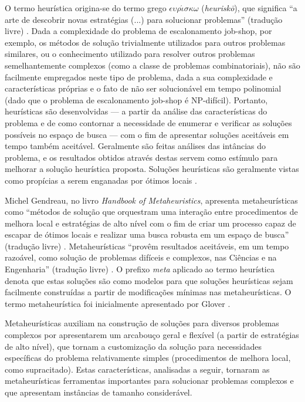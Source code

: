 \documentclass[relatorio,nocolorlinks]{inf-ufg}
\begin{document}
O termo heur\'{i}stica origina-se do termo grego $\epsilon\upsilon\rho\acute{\iota}\sigma\kappa\omega$ (\textit{heurisk\={o}}), que significa
``a arte de descobrir novas estrat\'{e}gias (...) para solucionar problemas'' (tradu\c{c}\~{a}o livre) \cite{Talbi2009}. Dada a complexidade do
problema de escalonamento job-shop, por exemplo, os m\'{e}todos de solu\c{c}\~{a}o trivialmente utilizados para outros problemas similares, ou o
conhecimento utilizado para resolver outros problemas semelhantemente complexos (como a classe de problemas combinatoriais), n\~{a}o s\~{a}o
facilmente empregados neste tipo de problema, dada a sua complexidade e caracter\'{i}sticas pr\'{o}prias e o fato de n\~{a}o ser solucion\'{a}vel
em tempo polinomial (dado que o problema de escalonamento job-shop \'{e} NP-dif\'{i}cil). Portanto, heur\'{i}sticas s\~{a}o desenvolvidas --- a
partir da an\'{a}lise das caracter\'{i}sticas do problema e de como contornar a necessidade de enumerar e verificar as solu\c{c}\~{o}es
poss\'{i}veis no espa\c{c}o de busca --- com o fim de apresentar solu\c{c}\~{o}es aceit\'{a}veis em tempo tamb\'{e}m aceit\'{a}vel. Geralmente
s\~{a}o feitas an\'{a}lises das int\^{a}ncias do problema, e os resultados obtidos atrav\'{e}s destas servem como est\'{i}mulo para melhorar a
solu\c{c}\~{a}o heur\'{i}stica proposta. Solu\c{c}\~{o}es heur\'{i}sticas s\~{a}o geralmente vistas como prop\'{i}cias a serem enganadas por
\'{o}timos locais \cite{Glover1986}.

Michel Gendreau, no livro \textit{Handbook of Metaheuristics}, apresenta metaheur\'{i}sticas como ``m\'{e}todos de solu\c{c}\~{a}o que orquestram
uma intera\c{c}\~{a}o entre procedimentos de melhora local e estrat\'{e}gias de alto n\'{i}vel com o fim de criar um processo capaz de escapar
de \'{o}timos locais e realizar uma busca robusta em um espa\c{c}o de busca'' (tradu\c{c}\~{a}o livre) \cite{Gendreau2010}. Metaheur\'{i}sticas
``prov\^{e}m resultados aceit\'{a}veis, em um tempo razo\'{a}vel, como solu\c{c}\~{a}o de problemas dif\'{i}ceis e complexos, nas Ci\^{e}ncias
e na Engenharia'' (tradu\c{c}\~{a}o livre) \cite{Talbi2009}. O prefixo \textit{meta} aplicado ao termo heur\'{i}stica denota que estas
solu\c{c}\~{o}es s\~{a}o como modelos para que solu\c{c}\~{o}es heur\'{i}sticas sejam facilmente constru\'{i}das a partir de modifica\c{c}\~{o}es
m\'{i}nimas nas metaheur\'{i}sticas. O termo metaheur\'{i}stica foi inicialmente apresentado por Glover \cite{Glover1986} \cite{Talbi2009}.

Metaheur\'{i}sticas auxiliam na constru\c{c}\~{a}o de solu\c{c}\~{o}es para diversos problemas complexos por apresentarem um arcabou\c{c}o geral
e flex\'{i}vel (a partir de estrat\'{e}gias de alto n\'{i}vel), que tornam a customiza\c{c}\~{a}o da solu\c{c}\~{a}o para necessidades
espec\'{i}ficas do problema relativamente simples (procedimentos de melhora local, como supracitado). Estas caracter\'{i}sticas, analisadas a
seguir, tornaram as metaheur\'{i}sticas ferramentas importantes para solucionar problemas complexos e que apresentam inst\^{a}ncias de tamanho
consider\'{a}vel.
\end{document}
